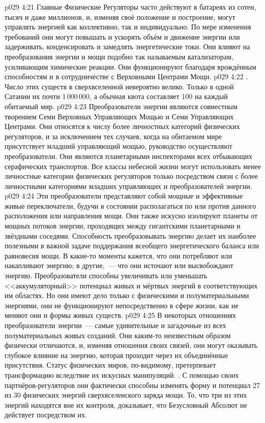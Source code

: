 \vs p029 4:21 Главные Физические Регуляторы часто действуют в батареях из сотен, тысяч и даже миллионов, и, изменяя своё положение и построение, могут управлять энергией как коллективно, так и индивидуально. По мере изменения требований они могут повышать и ускорять объём и движение энергии или задерживать, конденсировать и замедлять энергетические токи. Они влияют на преобразования энергии и мощи подобно так называемым катализаторам, усиливающим химические реакции. Они функционируют благодаря врождённым способностям и в сотрудничестве с Верховными Центрами Мощи.
\vs p029 4:22 . Число этих существ в сверхвселенной невероятно велико. Только в одной Сатании их почти 1\,000\,000, а обычная квота составляет 100 на каждый обитаемый мир.
\vs p029 4:23 Преобразователи энергии являются совместным творением Семи Верховных Управляющих Мощью и Семи Управляющих Центрами. Они относятся к числу более личностных категорий физических регуляторов, и за исключением тех случаев, когда на обитаемом мире присутствует младший управляющий мощью, руководство осуществляют преобразователи. Они являются планетарными инспекторами всех отбывающих серафических транспортов. Все классы небесной жизни могут использовать менее личностные категории физических регуляторов только посредством связи с более личностными категориями младших управляющих и преобразователей энергии.
\vs p029 4:24 Эти преобразователи представляют собой мощные и эффективные живые переключатели, будучи в состоянии располагаться по или против данного расположения или направления мощи. Они также искусно изолируют планеты от мощных потоков энергии, проходящих между гигантскими планетарными и звёздными соседями. Способность преобразовывать энергию делает их наиболее полезными в важной задаче поддержания всеобщего энергетического баланса или равновесия мощи. В какие\hyp{}то моменты кажется, что они потребляют или накапливают энергию; в другие,~--- что они источают или высвобождают энергию. Преобразователи способны увеличивать или уменьшать <<аккумуляторный>> потенциал живых и мёртвых энергий в соответствующих им областях. Но они имеют дело только с физическими и полуматериальными энергиями, они не функционируют непосредственно в сфере жизни, как не меняют они и формы живых существ.
\vs p029 4:25 В некоторых отношениях преобразователи энергии~--- самые удивительные и загадочные из всех полуматериальных живых созданий. Они каким\hyp{}то неизвестным образом физически отличаются, и, изменяя отношения своих связей, они могут оказывать глубокое влияние на энергию, которая проходит через их объединённые присутствия. Статус физических миров, по\hyp{}видимому, претерпевает трансформацию вследствие их искусных манипуляций. . С помощью своих партнёров\hyp{}регуляторов они фактически способны изменять форму и потенциал 27 из 30 физических энергий сверхвселенского заряда мощи. То, что три из этих энергий находятся вне их контроля, доказывает, что Безусловный Абсолют не действует посредством их.
